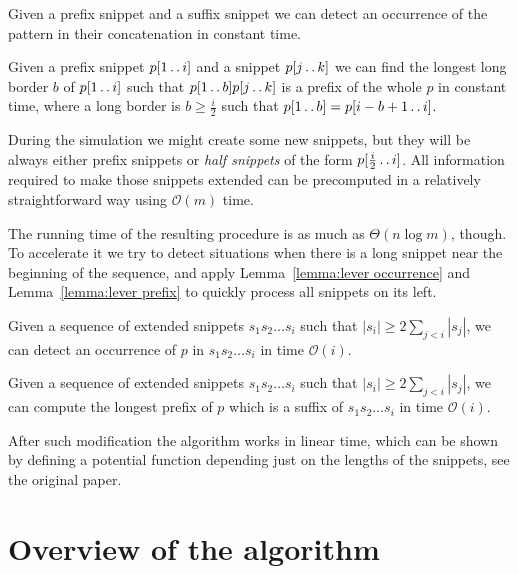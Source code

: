 \documentclass[runningheads]{llncs}
\newcommand{\twodots}{\mathinner{\ldotp\ldotp}}
\begin{document}
\begin{lemma}\label{lemma:concatenation occurrence}
Given a prefix snippet and a suffix snippet we can detect an occurrence of the pattern in their concatenation in constant time.
\end{lemma}

\begin{lemma}\label{lemma:extending long border}
Given a prefix snippet $p[1\twodots i]$ and a snippet $p[j\twodots k]$ we can find the longest long border $b$ of $p[1\twodots i]$ such that $p[1\twodots b]p[j\twodots k]$ is a prefix of the whole $p$ in constant time, where a long border is $b\geq\frac{i}{2}$ such that $p[1\twodots b]=p[i-b+1\twodots i]$.
\end{lemma}

During the simulation we might create some new snippets, but they will be always either prefix snippets or {\it half snippets} of the form $p[\frac{i}{2}\twodots i]$. All information required to make those snippets extended can be precomputed in a relatively straightforward way using $\mathcal{O}(m)$ time.

The running time of the resulting procedure is as much as $\Theta(n\log m)$, though. To accelerate it we try to detect situations when there is a long snippet near the beginning of the sequence, and apply Lemma~\ref{lemma:lever occurrence} and Lemma~\ref{lemma:lever prefix} to quickly process all snippets on its left.

\begin{lemma}\label{lemma:lever occurrence}
Given a sequence of extended snippets $s_1 s_2 \ldots s_i$ such that $|s_i|\geq 2\sum_{j<i}|s_j|$, we can detect an occurrence of $p$ in $s_1 s_2 \ldots s_i$ in time $\mathcal{O}(i)$.
\end{lemma}

\begin{lemma}\label{lemma:lever prefix}
Given a sequence of extended snippets $s_1 s_2 \ldots s_i$ such that $|s_i|\geq 2\sum_{j<i}|s_j|$, we can compute the longest prefix of $p$ which is a suffix of $s_1 s_2 \ldots s_i$ in time $\mathcal{O}(i)$.
\end{lemma}

After such modification the algorithm works in linear time, which can be shown by defining a potential function depending just on the lengths of the snippets, see the original paper.

\section{Overview of the algorithm}
\end{document}
